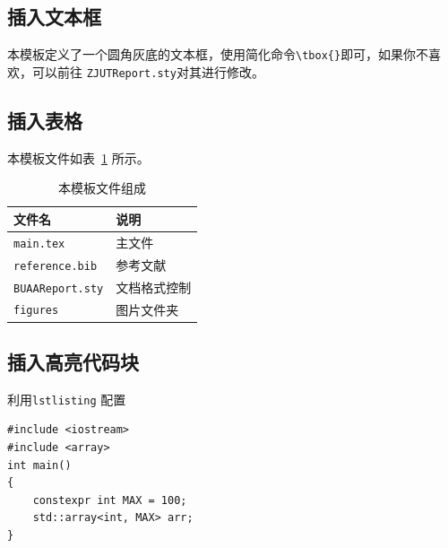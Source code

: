 \documentclass[12pt,hyperref,a4paper,UTF8]{ctexart}
\begin{document}
\subsection{插入文本框}
本模板定义了一个圆角灰底的文本框，使用简化命令\verb|\tbox{}|即可，如果你不喜欢，可以前往 \texttt{ZJUTReport.sty}对其进行修改。


\subsection{插入表格}
本模板文件如表~\ref{doc} 所示。
\begin{table}[!htbp]
    \centering
    \begin{tabular}{l  | l}
    \hline
        文件名 & 说明 \\
        \hline
        \texttt{main.tex}  & 主文件 \\
        \texttt{reference.bib} & 参考文献 \\
        \texttt{BUAAReport.sty}  & 文档格式控制\\
        \texttt{figures}  & 图片文件夹 \\
        \hline
    \end{tabular}
    \caption{本模板文件组成}
    \label{doc}
\end{table}

%
%
%
%
%
%

\subsection{插入高亮代码块}
利用\verb|lstlisting| 配置
\begin{lstlisting}[style=CPP, title="c++代码"]
#include <iostream>
#include <array>
int main()
{
    constexpr int MAX = 100;
    std::array<int, MAX> arr;
}  
\end{lstlisting}
\end{document}

